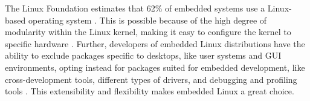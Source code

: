     The Linux Foundation estimates that 62\% of embedded systems use a
        Linux-based operating system \cite{linux-public-cloud}.
    This is possible because of the high degree of modularity within the Linux
        kernel, making it easy to configure the kernel to specific hardware
        \cite{embedded-textbook}.
    Further, developers of embedded Linux distributions have the ability to
        exclude packages specific to desktops, like user systems and GUI
        environments, opting instead for packages suited for embedded development,
        like cross-development tools, different types of drivers, and debugging
        and profiling tools \cite{embedded-textbook}.
    This extensibility and flexibility makes embedded Linux a great choice.
